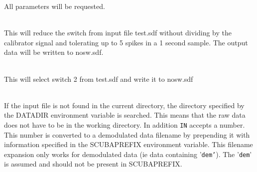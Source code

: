 \documentclass[twoside,11pt]{article}
\newcommand{\param}[1]{{\tt #1}}
\renewcommand{\_}{\texttt{\symbol{95}}}
\newlength{\sstexampleslength}
\newcommand{\sstexamplesubsection}[2]{\sloppy
\item[\parbox{\sstexampleslength}{\ssttt #1}] \mbox{} \vspace{1.0ex}
\\ #2 }
\newcommand{\sstnotes}[1]{\item[Notes:] \mbox{} \\[1.3ex] #1}
\newcommand{\sstexamplesubsection}[2]{\item[{\ssttt #1}] #2}
\newcommand{\sstnotes}[1]{\item[Notes:] #1 }
\begin{document}
{{{      }{
         All parameters will be requested.
      }
      \sstexamplesubsection{
         reduce\_switch test nosw
      }{
         This will reduce the switch from input file test.sdf without dividing
         by the calibrator signal and tolerating up to 5 spikes in a 1 second
         sample. The output data will be written to nosw.sdf.
      }
      \sstexamplesubsection{
         reduce\_switch test nosw SWITCH=2
      }{
         This will select switch 2 from test.sdf and write it to nosw.sdf
      }
   }
   \sstnotes{
      If the input file is not found in the current directory, the directory
      specified by the DATADIR environment variable is searched. This means
      that the raw data does not have to be in the working directory. In
      addition \param{IN} accepts a number. This number is converted to a
      demodulated data filename by prepending it with information specified in
      the SCUBA\_PREFIX environment variable. This filename expansion only
      works for demodulated data (ie data containing '\texttt{\_dem\_'}). The
      '\texttt{\_dem\_}' is assumed and should not be present in
      SCUBA\_PREFIX.
   }
}
\end{document}
